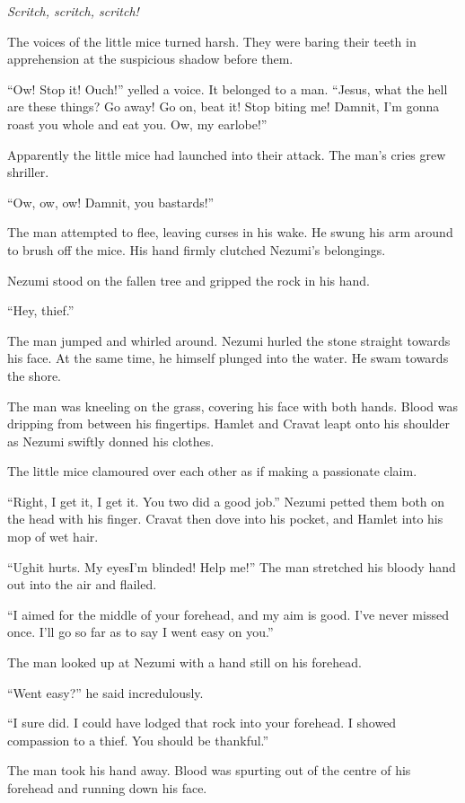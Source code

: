 \emph{Scritch, scritch, scritch!}

The voices of the little mice turned harsh. They were baring their teeth
in apprehension at the suspicious shadow before them.

``Ow! Stop it! Ouch!'' yelled a voice. It belonged to a man. ``Jesus,
what the hell are these things? Go away! Go on, beat it! Stop biting me!
Damnit, I'm gonna roast you whole and eat you. Ow, my earlobe!''

Apparently the little mice had launched into their attack. The man's
cries grew shriller.

``Ow, ow, ow! Damnit, you bastards!''

The man attempted to flee, leaving curses in his wake. He swung his arm
around to brush off the mice. His hand firmly clutched Nezumi's
belongings.

Nezumi stood on the fallen tree and gripped the rock in his hand.

``Hey, thief.''

The man jumped and whirled around. Nezumi hurled the stone straight
towards his face. At the same time, he himself plunged into the water.
He swam towards the shore.

The man was kneeling on the grass, covering his face with both hands.
Blood was dripping from between his fingertips. Hamlet and Cravat leapt
onto his shoulder as Nezumi swiftly donned his clothes.

The little mice clamoured over each other as if making a passionate
claim.

``Right, I get it, I get it. You two did a good job.'' Nezumi petted
them both on the head with his finger. Cravat then dove into his pocket,
and Hamlet into his mop of wet hair.

``Ugh\el it hurts. My eyes\el I'm blinded! Help me!'' The man stretched
his bloody hand out into the air and flailed.

``I aimed for the middle of your forehead, and my aim is good. I've
never missed once. I'll go so far as to say I went easy on you.''

The man looked up at Nezumi with a hand still on his forehead.

``Went easy?'' he said incredulously.

``I sure did. I could have lodged that rock into your forehead. I showed
compassion to a thief. You should be thankful.''

The man took his hand away. Blood was spurting out of the centre of his
forehead and running down his face.

